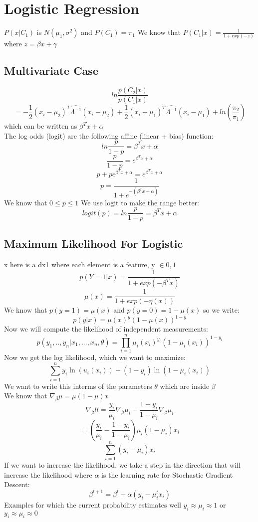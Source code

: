 \documentclass{article}
\begin{document}
\section{Logistic Regression}
$P(x|C_1)$ is $N(\mu_1, \sigma^2)$ and $P(C_1)=\pi_1$
We know that $P(C_1|x) = \frac{1}{1 + exp(-z)}$ where $z=\beta x + \gamma$

\subsection{Multivariate Case}
$$ln \frac{p(C_2|x)}{p(C_1|x)}$$
$$= -\frac{1}{2} (x_i-\mu_2)^T \hat{\Lambda^{-1}} (x_i - \mu_2) + \frac{1}{2} (x_i-\mu_1)^T \hat{\Lambda^{-1}} (x_i - \mu_1) + ln(\frac{\pi_2}{\pi_1})$$
which can be written as $\beta^T x + \alpha$ \\
The log odds (logit) are the following affine (linear + bias) function:
$$ln \frac{p}{1-p} = \beta^T x + \alpha$$
$$\frac{p}{1-p} = e^{\beta^T x + \alpha}$$
$$p + p e^{\beta^T x + \alpha} = e^{\beta^T x + \alpha} $$
$$p = \frac{1}{1+e^{-(\beta^T x + \alpha)}}$$
We know that $0 \leq p \leq 1$
We use logit to make the range better:
$$logit(p) = ln \frac{p}{1-p} = \beta^T x + \alpha$$

\subsection{Maximum Likelihood For Logistic}
x here is a dx1 where each element is a feature, y $\in {0,1}$
$$p(Y=1|x) = \frac{1}{1 + exp(-\beta^T x)}$$
$$\mu(x) = \frac{1}{1 + exp(-\eta(x))}$$
We know that $p(y=1) = \mu(x)$ and $p(y=0) = 1 - \mu(x)$ so we write:
$$p(y|x) = \mu(x)^y (1-\mu(x))^{1-y}$$
Now we will compute the likelihood of independent measurements:
$$p(y_1,..,y_n|x_1,...,x_n,\theta) = \prod_{i=1}^n \mu_i(x_i)^{y_i} (1-\mu_i(x_i))^{1-y_i}$$
Now we get the log likelihood, which we want to maximize:
$$\sum_{i=1}^n y_i \ln(u_i(x_i)) + (1-y_i) \ln(1-\mu_i(x_i))$$
We want to write this interms of the parameters $\theta$ which are inside $\beta$ \\
We know that $\nabla_{\beta} \mu = \mu (1-\mu) x$
$$\nabla_{\beta} ll = \frac{y_i}{\mu_i} \nabla_{\beta} \mu_i - \frac{1-y_i}{1-\mu_i} \nabla_{\beta} \mu_i$$
$$= (\frac{y_i}{\mu_i} - \frac{1-y_i}{1-\mu_i}) \mu_i (1-\mu_i) x_i$$
$$\sum_{i=1}^n (y_i - \mu_i) x_i$$
If we want to increase the likelihood, we take a step in the direction that will increase the likelihood where $\alpha$ is the learning rate for Stochastic Gradient Descent:
$$\beta^{t+1} = \beta^t + \alpha(y_i - \mu_i^tx_i)$$
Examples for which the current probability estimates well $y_i \approx \mu_i \approx 1$ or $y_i \approx \mu_i \approx 0$
\end{document}
